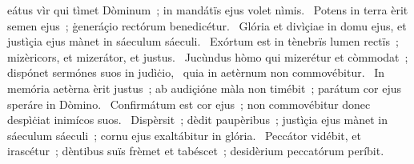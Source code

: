 \psalmChapterWithInscription{}
{ }
{%
eátus vìr qui tìmet Dòminum~; in mandátïs ejus volet nìmis. 
~Potens in terra èrit semen ejus~; ġeneráçio rectórum benedicétur. 
~Glória et divìçiae in domu ejus, et justìçia ejus mànet in sáeculum sáeculi. 
~Exórtum est in tènebrïs lumen rectïs~; mizèricors, et mizerátor, et justus. 
~Jucùndus hòmo qui mizerétur et còmmodat~; dispónet sermónes suos in judìċio, 
~quia in aetèrnum non commovébitur. 
~In memória aetèrna èrit justus~; ab audiçióne màla non timébit~; parátum cor ejus speráre in Dòmino. 
~Confirmátum est cor ejus~; non commovébitur donec despìċiat inimícos suos. 
~Dispèrsit~; dèdit paupèribus~; justìçia ejus mànet in sáeculum sáeculi~; cornu ejus exaltábitur in glória. 
~Peccátor vidébit, et irascétur~; dèntibus suïs frèmet et tabéscet~; desidèrium peccatórum períbit. 
}
